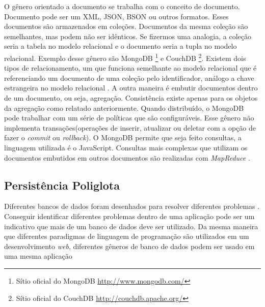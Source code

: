 O gênero orientado a documento se trabalha com o conceito de documento. Documento pode ser um \ac{XML}, JSON, BSON ou outros formatos. Esses documentos são armazenados em coleções. Documentos da mesma coleção são semelhantes, mas podem não ser idênticos. Se fizermos uma analogia, a coleção seria a tabela no modelo relacional e o documento seria a tupla no modelo relacional. Exemplo desse gênero são MongoDB \footnote{Sítio oficial do MongoDB \url{http://www.mongodb.com/}} e CouchDB \footnote{Sítio oficial do CouchDB \url{http://couchdb.apache.org/}}\cite{NoSQL}.
Existem dois tipos de relacionamento, um que funciona semelhante ao modelo relacional que é referenciando um documento de uma coleção pelo identificador, análogo a chave estrangeira no modelo relacional . A outra maneira é embutir documentos dentro de um documento, ou seja, agregação. Consistência existe apenas para os objetos da agregação como relatado anteriormente. Quando distribuído, o MongoDB pode trabalhar com um série de políticas que são configuráveis. Esse gênero não implementa transações(operações de inserir, atualizar ou deletar com a opção de fazer o \textit{commit} ou \textit{rollback}). O MongoDB permite que seja feito consultas, a linguagem utilizada é o JavaScript. Consultas mais complexas que utilizam os documentos embutidos em outros documentos são realizadas com \textit{MapReduce} \cite{NoSQL}.

\subsection{Persistência Poliglota}
\label{subsec:polyglotpersitence}
Diferentes bancos de dados foram desenhados para resolver diferentes problemas \cite{NoSQL}. Conseguir identificar diferentes problemas dentro de uma aplicação pode ser um indicativo que mais de um banco de dados deve ser utilizado. Da mesma maneira que diferentes paradigmas de linguagem de programação são utilizados em um desenvolvimento \textit{web}, diferentes gêneros de banco de dados podem ser usado em uma mesma aplicação \cite{multiparadigma}



